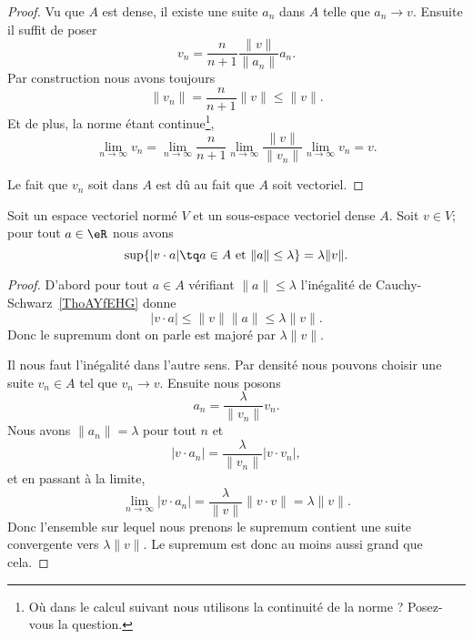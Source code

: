 \begin{proof}
    Vu que \( A\) est dense, il existe une suite \( a_n\) dans \( A\) telle que \( a_n\to v\). Ensuite il suffit de poser
    \begin{equation}
        v_n=\frac{ n }{ n+1 }\frac{ \| v \| }{ \| a_n \| }a_n.
    \end{equation}
    Par construction nous avons toujours
    \begin{equation}
        \| v_n \|=\frac{ n }{ n+1 }\| v \|\leq \| v \|.
    \end{equation}
    Et de plus, la norme étant continue\footnote{Où dans le calcul suivant nous utilisons la continuité de la norme ? Posez-vous la question.},
    \begin{equation}
        \lim_{n\to \infty} v_n=\lim_{n\to \infty} \frac{ n }{ n+1 }\lim_{n\to \infty} \frac{ \| v \| }{ \| v_n \| }\lim_{n\to \infty} v_n=v.
    \end{equation}

    Le fait que \( v_n\) soit dans \( A\) est dû au fait que \( A\) soit vectoriel.
\end{proof}

\begin{proposition}     \label{PROPooVEMGooYKhMFy}
    Soit un espace vectoriel normé \( V\) et un sous-espace vectoriel dense \( A\). Soit \( v\in V\); pour tout \( a\in \eR\) nous avons
    \begin{equation}
        \sup\{ | v\cdot a |\tq a\in A\text{ et }\| a \|\leq \lambda \}=\lambda\| v \|.
    \end{equation}
\end{proposition}

\begin{proof}
    D'abord pour tout \( a\in A\) vérifiant \( \| a \|\leq \lambda\) l'inégalité de Cauchy-Schwarz~\ref{ThoAYfEHG} donne
    \begin{equation}
        | v\cdot a |\leq \| v \|\| a \|\leq \lambda\| v \|.
    \end{equation}
    Donc le supremum dont on parle est majoré par \( \lambda\| v \|\).

    Il nous faut l'inégalité dans l'autre sens. Par densité nous pouvons choisir une suite \( v_n\in A\) tel que \( v_n\to v\). Ensuite nous posons
    \begin{equation}
        a_n=\frac{ \lambda }{ \| v_n \| }v_n.
    \end{equation}
    Nous avons \( \| a_n \|=\lambda\) pour tout \( n\) et
    \begin{equation}
        | v\cdot a_n |=\frac{ \lambda }{ \| v_n \| }| v\cdot v_n |,
    \end{equation}
    et en passant à la limite,
    \begin{equation}
        \lim_{n\to \infty} | v\cdot a_n |=\frac{ \lambda }{ \| v \| }\| v\cdot v \|=\lambda\| v \|.
    \end{equation}
    Donc l'ensemble sur lequel nous prenons le supremum contient une suite convergente vers \( \lambda\| v \|\). Le supremum est donc au moins aussi grand que cela.
\end{proof}

